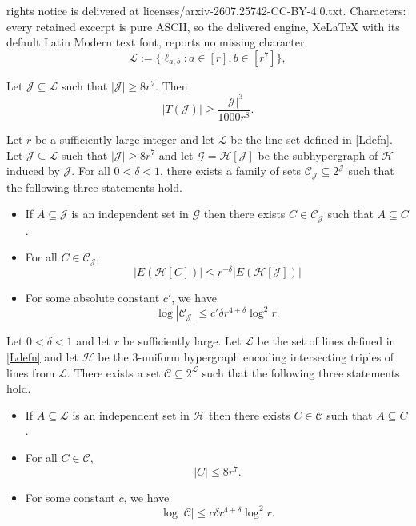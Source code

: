 \documentclass[10pt,a4paper]{amsart}
\newcommand{\cC}{\mathcal{C}}
\newcommand{\cG}{\mathcal{G}}
\newcommand{\cH}{\mathcal{H}}
\newcommand{\cJ}{\mathcal{J}}
\newcommand{\cL}{\mathcal{L}}
\begin{document}
rights notice is delivered at licenses/arxiv-2607.25742-CC-BY-4.0.txt. Characters: every retained excerpt is pure ASCII, so the delivered engine, XeLaTeX with its default Latin Modern text font, reports no missing character.
\begin{equation} \label{Ldefn}
\mathcal L:= \{ \ell_{a,b} : a \in [r], b \in [r^7] \},
\end{equation}

\begin{lemma} \label{lem:sslL}
Let $\mathcal J \subseteq \mathcal L$ such that $|\mathcal J| \geq 8r^7$. Then
\[
|T(\mathcal J)| \geq \frac{|\mathcal J|^3}{1000r^8}.
\]
\end{lemma}

\begin{lemma} \label{lem:cont1}
   Let $r$ be a sufficiently large integer and let $\cL$ be the line set defined in \eqref{Ldefn}. Let $\mathcal J \subseteq \mathcal L$ such that $|\cJ| \geq 8r^7$ and let $\cG=\mathcal H[ \mathcal J]$ be the subhypergraph of $\mathcal H$ induced by $\mathcal J$. For all $0<\delta <1$, there exists a family of sets $\mathcal C_{\mathcal J} \subseteq 2^{\mathcal J}$ such that the following three statements hold.
    \begin{itemize}
        \item If $A \subseteq \mathcal J$ is an independent set in $\cG$ then there exists $C \in \mathcal C_{ \mathcal J}$ such that $A \subseteq C$.
        \item For all $C \in \mathcal C_{ \mathcal J}$,
        \[
        |E(\cH[C])| \leq r^{-\delta} |E( \cH[\cJ])|
        \]
        \item For some absolute constant $c'$, we have 
        \[
        \log | \cC_{\cJ}| \leq c'\delta r^{4+\delta} \log^2 r .
        \]
    \end{itemize}
\end{lemma}

\begin{lemma} \label{lem:cont2}
   Let $0 < \delta < 1$ and let $r$ be sufficiently large. Let $\cL$ be the set of lines defined in \eqref{Ldefn} and let $\cH$ be the $3$-uniform hypergraph encoding intersecting triples of lines from $\cL$. There exists a set $\cC \subseteq 2^{\cL}$ such that the following three statements hold.
   \begin{itemize}
        \item If $A \subseteq \mathcal L$ is an independent set in $\cH$ then there exists $C \in \mathcal C$ such that $A \subseteq C$.
        \item For all $C \in \mathcal C$,
        \[
        |C| \leq 8r^7.
        \]
        \item For some constant $c$, we have 
        \[
        \log | \cC| \leq c\delta r^{4+\delta} \log^2 r .
        \]
    \end{itemize}
\end{lemma}
\end{document}
